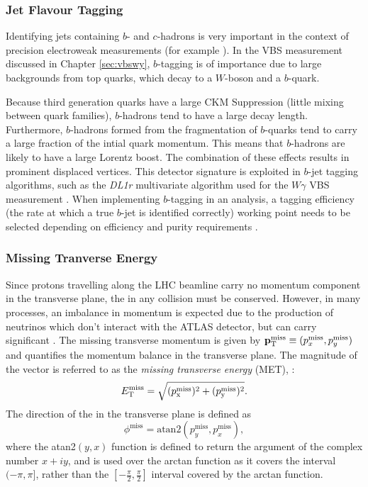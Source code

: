 \subsubsection{Jet Flavour Tagging}
Identifying jets containing $b$- and $c$-hadrons is very important in the context of precision electroweak measurements (for example \cite{Atlas:Hbb,Atlas:Hcc}). In the VBS measurement discussed in Chapter \ref{sec:vbswy}, $b$-tagging is of importance due to large backgrounds from top quarks, which decay to a $W$-boson and a $b$-quark. 

Because third generation quarks have a large CKM Suppression (little mixing between quark families), $b$-hadrons tend to have a large decay length. Furthermore, $b$-hadrons formed from the fragmentation of $b$-quarks tend to carry a large fraction of the intial quark momentum. This means that $b$-hadrons are likely to have a large Lorentz boost. The combination of these effects results in prominent displaced vertices. This detector signature is exploited in $b$-jet tagging algorithms, such as the \textit{DL1r} multivariate algorithm used for the $W\gamma$ VBS measurement \cite{Atlas:btagging}. When implementing $b$-tagging in an analysis, a tagging efficiency (the rate at which a true $b$-jet is identified correctly) working point needs to be selected depending on efficiency and purity requirements \cite{Buckley:PCP}. 

\subsubsection{Missing Tranverse Energy}

Since protons travelling along the LHC beamline carry no momentum component in the transverse plane, the \pt in any collision must be conserved. However, in many processes, an imbalance in momentum is expected due to the production of neutrinos which don't interact with the ATLAS detector, but can carry significant \pt. The missing transverse momentum \ptmiss is given by $\mathbf{p}_{\text{T}}^{\text{miss}}\equiv(p^{\text{miss}}_x,p^{\text{miss}}_y)$ and quantifies the momentum balance in the transverse plane. The magnitude of the vector \ptmiss is referred to as the \textit{missing transverse energy} (MET), \met:
\begin{equation}\label{eq:etmiss_sum}
    E_{\text{T}}^{\text{miss}} = \sqrt{(p^{\text{miss}}_{\mathrm{x}})^2+(p^{\text{miss}}_{\mathrm{y}})^2}.
\end{equation}
The direction of the \ptmiss in the transverse plane is defined as
\begin{equation}
    \phi^{\text{miss}}=\text{atan2}(p_y^{\text{miss}},p_x^{\text{miss}}),
\end{equation}
where the atan2$(y,x)$ function is defined to return the argument of the complex number $x+iy$, and is used over the arctan function as it covers the interval $(-\pi,\pi]$, rather than the $[-\frac{\pi}{2},\frac{\pi}{2}]$ interval covered by the arctan function.

